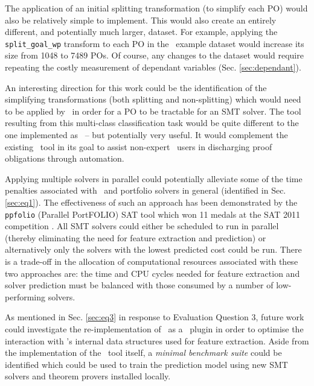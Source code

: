 The application of an initial splitting transformation (to simplify each PO) would also be relatively simple to implement.
This would also create an entirely different, and potentially much larger, dataset. 
For example, applying the \texttt{split\_goal\_wp} transform to each PO in the \why~example dataset would increase its size from 1048 to 7489 POs.
Of course, any changes to the dataset would require repeating the costly measurement of dependant variables (Sec. \ref{sec:dependant}).

An interesting direction for this work could be the identification of the simplifying transformations (both splitting and non-splitting) which would need to be applied by \why~in order for a PO to be tractable for an SMT solver.
The tool resulting from this multi-class classification task would be quite different to the one implemented as \where~-- but  potentially very useful.
It would complement the existing \where~tool in its goal to assist non-expert \why~users in discharging proof obligations through automation.

Applying multiple solvers in parallel could potentially alleviate some of the time penalties associated with \where~and portfolio solvers in general (identified in Sec. \ref{sec:eq1}).
The effectiveness of such an approach has been demonstrated by the \texttt{ppfolio} (Parallel PortFOLIO) SAT tool which won 11 medals at the SAT 2011 competition \cite{Malitsky2012}.
All SMT solvers could either be scheduled to run in parallel (thereby eliminating the need for feature extraction and prediction) or alternatively only the solvers with the lowest predicted cost could be run.
There is a trade-off in the allocation of computational resources associated with these two approaches are: the time and CPU cycles needed for feature extraction and solver prediction must be balanced with those consumed by a number of low-performing solvers.     
 
As mentioned in Sec. \ref{sec:eq3} in response to Evaluation Question 3, future work could investigate the re-implementation of \where~as a \why~plugin in order to optimise the interaction with \why's internal data structures used for feature extraction.
Aside from the implementation of the \where~tool itself, a
\textit{minimal benchmark suite} could be identified which could be used to train the prediction model using new SMT solvers and theorem provers installed locally.
